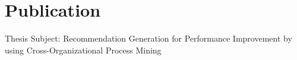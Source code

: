 \section{Publication}
\sectionspace %
Thesis Subject: Recommendation Generation for Performance Improvement by using Cross-Organizational Process Mining
 
